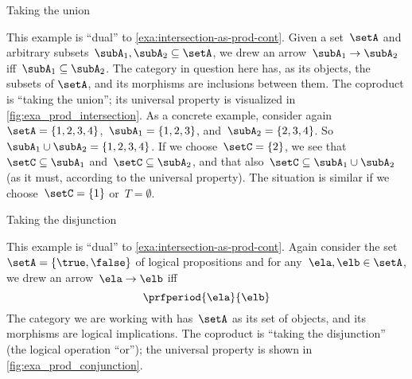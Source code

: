 \begin{marginfigure}
    \centering
    \caption{Taking the union}
    \label{fig:exa_coprod_union_cont}
\end{marginfigure}

\begin{example}
    \label{exa:union-as-coprod-cont}
    This example is ``dual'' to \cref{exa:intersection-as-prod-cont}.
    Given a set~$\setA$ and arbitrary subsets~$\subA_1, \subA_2 \subseteq \setA$, we drew an arrow~$\subA_1 \to \subA_2$ iff~$\subA_1 \subseteq \subA_2$.
    The category in question here has, as its objects, the subsets of $\setA$, and its morphisms are inclusions between them.
    The coproduct is ``taking the union''; its universal property is visualized in \cref{fig:exa_prod_intersection}.
    As a concrete example, consider again~$\setA = \{ 1, 2, 3, 4 \}$,~$\subA_1 = \{ 1, 2, 3 \}$, and~$\subA_2 = \{2, 3, 4 \}$.
    So~$\subA_1 \cup \subA_2 = \{1,2, 3,4\}$.
    If we choose~$\setC = \{ 2 \}$, we see that~$\setC \subseteq \subA_1$ and~$\setC \subseteq \subA_2$, and that also~$\setC \subseteq \subA_1 \cup \subA_2$ (as it must, according to the universal property).
    The situation is similar if we choose~$\setC = \{ 1\}$ or~$T = \emptyset$.
\end{example}

\begin{marginfigure}
    \centering
    \caption{Taking the disjunction}
    \label{fig:exa_coprod_disjunction_cont}
\end{marginfigure}
\begin{example}
    \label{exa:disjunction-as-coprod-cont}
    This example is ``dual'' to \cref{exa:intersection-as-prod-cont}.
    Again consider the set~$\setA = \{ \true, \false \}$ of logical propositions and for any~$\ela, \elb  \in \setA$, we drew an arrow~$\ela \to \elb$ iff
    \begin{equation*}
        \prfperiod{\ela}{\elb}
    \end{equation*}
    The category we are working with has~$\setA$ as its set of objects, and its morphisms are logical implications.
    The coproduct is ``taking the disjunction'' (the logical operation ``or''); the universal property is shown in \cref{fig:exa_prod_conjunction}.
\end{example}

